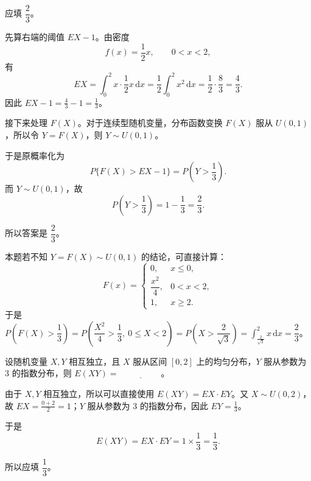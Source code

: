 ﻿\documentclass[lang=cn,11pt]{elegantbook}
\begin{document}
\begin{solution}
应填 \(\dfrac23\)。

先算右端的阈值 \(EX-1\)。由密度
\[
f(x)=\frac12x,\qquad 0<x<2,
\]
有
\[
EX=\int_0^2 x\cdot \frac12x\,\mathrm dx
=\frac12\int_0^2 x^2\,\mathrm dx
=\frac12\cdot\frac{8}{3}
=\frac43.
\]
因此 \(EX-1=\frac43-1=\frac13\)。

接下来处理 \(F(X)\)。对于连续型随机变量，分布函数变换 \(F(X)\) 服从 \(U(0,1)\)，所以令 \(Y=F(X)\)，则 \(Y\sim U(0,1)\)。

于是原概率化为
\[
P\{F(X)>EX-1\}=P\left(Y>\frac13\right).
\]
而 \(Y\sim U(0,1)\)，故
\[
P\left(Y>\frac13\right)=1-\frac13=\frac23.
\]

所以答案是 \(\dfrac23\)。
\end{solution}
\begin{note}
本题若不知 \(Y = F(X) \sim U(0,1)\) 的结论，可直接计算：
\[
F(x) = \begin{cases} 0, & x \leqslant 0, \\ \dfrac{x^2}{4}, & 0 < x < 2, \\ 1, & x \geqslant 2. \end{cases}
\]
于是 \(P\!\left(F(X) > \dfrac{1}{3}\right) = P\!\left(\dfrac{X^2}{4} > \dfrac{1}{3},\ 0 \leqslant X < 2\right) = P\!\left(X > \dfrac{2}{\sqrt{3}}\right) = \displaystyle\int_{\frac{2}{\sqrt{3}}}^{2} x\,\mathrm{d}x = \dfrac{2}{3}\)。
\end{note}


\begin{exercise}\label{exer:4-6-exy}
设随机变量 \(X, Y\) 相互独立，且 \(X\) 服从区间 \([0,2]\) 上的均匀分布，\(Y\) 服从参数为 3 的指数分布，则 \(E(XY) =\,\underline{\hspace{2cm}}\)。
\end{exercise}
\begin{solution}
由于 \(X,Y\) 相互独立，所以可以直接使用 \(E(XY)=EX\cdot EY\)。又 \(X\sim U(0,2)\)，故 \(EX=\frac{0+2}{2}=1\)；\(Y\) 服从参数为 3 的指数分布，因此 \(EY=\frac{1}{3}\)。

于是
\[
E(XY) = EX \cdot EY = 1 \times \frac{1}{3} = \frac{1}{3}.
\]

所以应填 \(\dfrac13\)。
\end{solution}
\end{document}
